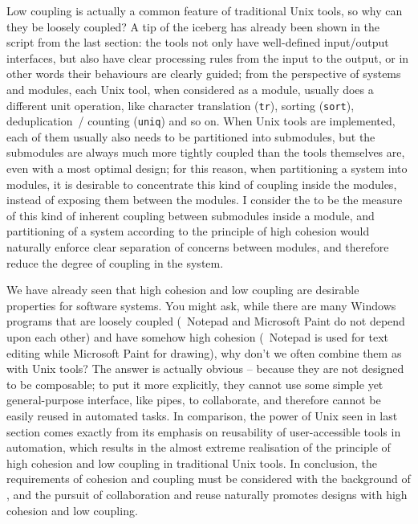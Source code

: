 Low coupling is actually a common feature of traditional Unix tools, so why can
they be loosely coupled?  A tip of the iceberg has already been shown in the
script from the last section: the tools not only have well-defined input/output
interfaces, but also have clear processing rules from the input to the output,
or in other words their behaviours are clearly guided; from the perspective of
systems and modules, each Unix tool, when considered as a module, usually does
a different unit operation, like character translation (\verb|tr|), sorting
(\verb|sort|), deduplication~/ counting (\verb|uniq|) and so on.  When Unix
tools are implemented, each of them usually also needs to be partitioned into
submodules, but the submodules are always much more tightly coupled than the
tools themselves are, even with a most optimal design; for this reason, when
partitioning a system into modules, it is desirable to concentrate this kind
of coupling inside the modules, instead of exposing them between the modules.
I consider the  to be the measure of this
kind of inherent coupling between submodules inside a module, and
partitioning of a system according to the principle of high cohesion
would naturally enforce clear separation of concerns between modules,
and therefore reduce the degree of coupling in the system.

We have already seen that high cohesion and low coupling are desirable
properties for software systems.  You might ask, while there are many Windows
programs that are loosely coupled (\eg~Notepad and Microsoft Paint do not
depend upon each other) and have somehow high cohesion (\eg~Notepad is used
for text editing while Microsoft Paint for drawing), why don't we often combine
them as with Unix tools?  The answer is actually obvious -- because they are
not designed to be composable; to put it more explicitly, they cannot use some
simple yet general-purpose interface, like pipes, to collaborate, and therefore
cannot be easily reused in automated tasks.  In comparison, the power of
Unix seen in last section comes exactly from its emphasis on reusability of
user-accessible tools in automation, which results in the almost extreme
realisation of the principle of high cohesion and low coupling in traditional
Unix tools.  In conclusion, the requirements of cohesion
and coupling must be considered with the background of , and the pursuit of collaboration and reuse naturally
promotes designs with high cohesion and low coupling.

